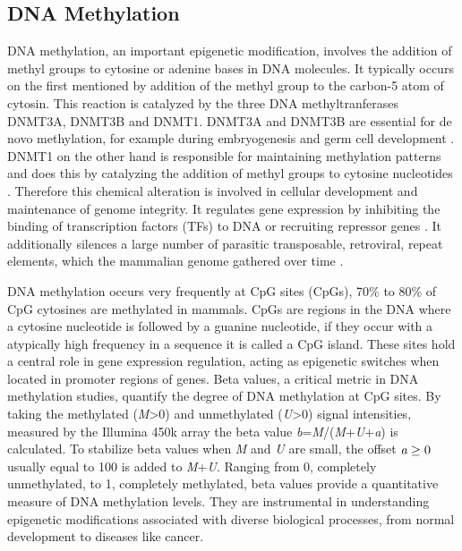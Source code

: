 \documentclass[pdftex,12pt,a4paper]{report}
\begin{document}
\subsection{DNA Methylation}
DNA methylation, an important epigenetic modification, involves the addition of methyl groups to cytosine or adenine bases in DNA molecules. It typically occurs on the first mentioned by addition of the methyl group to the carbon-5 atom of cytosin. This reaction is catalyzed by the three DNA methyltranferases DNMT3A, DNMT3B and DNMT1. DNMT3A and DNMT3B are essential for de novo methylation, for example during embryogenesis and germ cell development \cite{methylation_dnmtsAB}. DNMT1 on the other hand is responsible for maintaining methylation patterns and does this by catalyzing the addition of methyl groups to cytosine nucleotides \cite{methylation_dnmts1}. Therefore this chemical alteration is involved in cellular development and maintenance of genome integrity. It regulates gene expression by inhibiting the binding of transcription factors (TFs) to DNA or recruiting repressor genes \cite{gene_regulation}. It additionally silences a large number of parasitic transposable, retroviral, repeat elements, which the mammalian genome gathered over time \cite{MethRole}.

DNA methylation occurs very frequently at CpG sites (CpGs), 70\% to 80\% of CpG cytosines are methylated in mammals\cite{methylation_cpg}.
CpGs are regions in the DNA where a cytosine nucleotide is followed by a guanine nucleotide, if they occur with a atypically high frequency in a sequence it is called a CpG island\cite{cpgislandguide}.
These sites hold a central role in gene expression regulation, acting as epigenetic switches when located in promoter regions of genes\cite{cpgisland}. 
Beta values, a critical metric in DNA methylation studies, quantify the degree of DNA methylation at CpG sites. By taking the methylated (\emph{M}>0) and unmethylated (\emph{U}>0) signal intensities, measured by the Illumina 450k array the beta value \emph{b}=\emph{M}/(\emph{M}+\emph{U}+\emph{a}) is calculated. To stabilize beta values when \emph{M} and \emph{U} are small, the offset $\emph{a}\geq0$ usually equal to 100 is added to \emph{M}+\emph{U}. Ranging from 0, completely unmethylated, to 1, completely methylated, beta values provide a quantitative measure of DNA methylation levels. They are instrumental in understanding epigenetic modifications associated with diverse biological processes, from normal development to diseases like cancer\cite{mvalues}.
\end{document}
